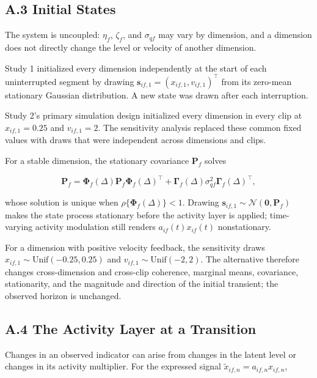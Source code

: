 \documentclass[
]{article}
\begin{document}
\subsection{A.3 Initial States}\label{a.3-initial-states}

The system is uncoupled: \(\eta_f\), \(\zeta_f\), and \(\sigma_{qf}\)
may vary by dimension, and a dimension does not directly change the
level or velocity of another dimension.

Study 1 initialized every dimension independently at the start of each
uninterrupted segment by drawing
\(\mathbf s_{if,1}=(x_{if,1},v_{if,1})^\top\) from its zero-mean
stationary Gaussian distribution. A new state was drawn after each
interruption.

Study 2's primary simulation design initialized every dimension in every
clip at \(x_{if,1}=0.25\) and \(v_{if,1}=2\). The sensitivity analysis
replaced these common fixed values with draws that were independent
across dimensions and clips.

For a stable dimension, the stationary covariance \(\mathbf P_f\) solves

\[
\mathbf{P}_f=\boldsymbol{\Phi}_f(\Delta)\mathbf{P}_f\boldsymbol{\Phi}_f(\Delta)^\top
+\boldsymbol{\Gamma}_f(\Delta)\sigma_{qf}^2\boldsymbol{\Gamma}_f(\Delta)^\top,
\]

whose solution is unique when \(\rho\{\boldsymbol{\Phi}_f(\Delta)\}<1\).
Drawing \(\mathbf{s}_{if,1}\sim\mathcal{N}(\mathbf{0},\mathbf{P}_f)\)
makes the state process stationary before the activity layer is applied;
time-varying activity modulation still renders \(a_{if}(t)x_{if}(t)\)
nonstationary.

For a dimension with positive velocity feedback, the sensitivity draws
\(x_{if,1}\sim\mathrm{Unif}(-0.25,0.25)\) and
\(v_{if,1}\sim\mathrm{Unif}(-2,2)\). The alternative therefore changes
cross-dimension and cross-clip coherence, marginal means, covariance,
stationarity, and the magnitude and direction of the initial transient;
the observed horizon is unchanged.

\subsection{A.4 The Activity Layer at a
Transition}\label{a.4-the-activity-layer-at-a-transition}

Changes in an observed indicator can arise from changes in the latent
level or changes in its activity multiplier. For the expressed signal
\(\tilde{x}_{if,n}=a_{if,n}x_{if,n}\),
\end{document}
